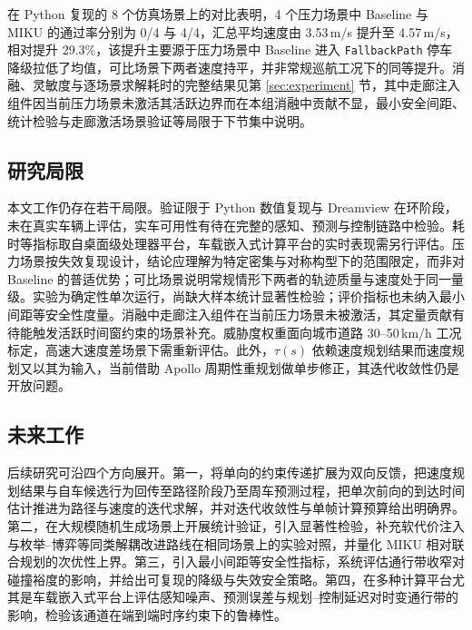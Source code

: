 \documentclass[a4paper,11pt]{ctexart}
\theoremstyle{definition}
\begin{document}
在 Python 复现的 8 个仿真场景上的对比表明，4 个压力场景中 Baseline 与 MIKU 的通过率分别为 0/4 与 4/4，汇总平均速度由 3.53\,m/s 提升至 4.57\,m/s，相对提升 29.3\%，该提升主要源于压力场景中 Baseline 进入 \texttt{FallbackPath} 停车降级拉低了均值，可比场景下两者速度持平，并非常规巡航工况下的同等提升。消融、灵敏度与逐场景求解耗时的完整结果见第 \ref{sec:experiment} 节，其中走廊注入组件因当前压力场景未激活其活跃边界而在本组消融中贡献不显，最小安全间距、统计检验与走廊激活场景验证等局限于下节集中说明。

\subsection{研究局限}

本文工作仍存在若干局限。验证限于 Python 数值复现与 Dreamview 在环阶段，未在真实车辆上评估，实车可用性有待在完整的感知、预测与控制链路中检验。耗时等指标取自桌面级处理器平台，车载嵌入式计算平台的实时表现需另行评估。压力场景按失效复现设计，结论应理解为特定密集与对称构型下的范围限定，而非对 Baseline 的普适优势；可比场景说明常规情形下两者的轨迹质量与速度处于同一量级。实验为确定性单次运行，尚缺大样本统计显著性检验；评价指标也未纳入最小间距等安全性度量。消融中走廊注入组件在当前压力场景未被激活，其定量贡献有待能触发活跃时间窗约束的场景补充。威胁度权重面向城市道路 30--50\,km/h 工况标定，高速大速度差场景下需重新评估。此外，$\tau(s)$ 依赖速度规划结果而速度规划又以其为输入，当前借助 Apollo 周期性重规划做单步修正，其迭代收敛性仍是开放问题。

\subsection{未来工作}

后续研究可沿四个方向展开。第一，将单向的约束传递扩展为双向反馈，把速度规划结果与自车候选行为回传至路径阶段乃至周车预测过程，把单次前向的到达时间估计推进为路径与速度的迭代求解，并对迭代收敛性与单帧计算预算给出明确界。第二，在大规模随机生成场景上开展统计验证，引入显著性检验，补充软代价注入与枚举--博弈等同类解耦改进路线在相同场景上的实验对照，并量化 MIKU 相对联合规划的次优性上界。第三，引入最小间距等安全性指标，系统评估通行带收窄对碰撞裕度的影响，并给出可复现的降级与失效安全策略。第四，在多种计算平台尤其是车载嵌入式平台上评估感知噪声、预测误差与规划--控制延迟对时变通行带的影响，检验该通道在端到端时序约束下的鲁棒性。


\printbibliography[heading=bibintoc,title={参考文献}]
\end{document}
